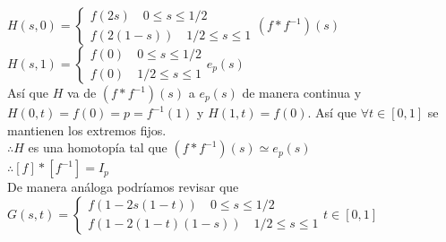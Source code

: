 \documentclass[11pt,a4paper,oneside]{report}
\theoremstyle{definition}
\theoremstyle{plain}
\theoremstyle{remark}
\begin{document}
$H(s,0) = \left\{
  \begin{array}{l}
    f(2s) \quad 0\leq s \leq 1/2  \\
    f(2(1-s)) \quad 1/2 \leq s \leq 1 
  \end{array}
  (f*f^{-1})(s)
\right.$\\

$H(s,1) = \left\{
  \begin{array}{l}
    f(0) \quad 0\leq s \leq 1/2  \\
    f(0) \quad 1/2 \leq s \leq 1 
  \end{array}
  e_p(s)
\right.$\\

Así que $H$ va de $(f*f^{-1})(s)$ a $e_p(s)$ de manera continua y 
$H(0,t)=f(0)=p=f^{-1}(1)$ y $H(1,t)=f(0)$. Así que $\forall t\in [0,1]$ se mantienen los extremos fijos.\\
$\therefore H$ es una homotopía tal que $(f*f^{-1})(s)\simeq e_p(s)$\\
$\therefore[f]*[f^{-1}]=I_p$\\
De manera análoga podríamos revisar que \\
$G(s,t) = \left\{
  \begin{array}{l}
    f(1-2s(1-t)) \quad 0\leq s \leq 1/2  \\
    f(1-2(1-t)(1-s)) \quad 1/2 \leq s \leq 1 
  \end{array}
  t \in [0,1]
\right.$\\
\end{document}
